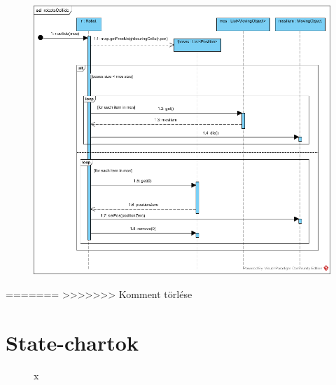 \begin{figure}[!htbp]
	\begin{center}
		\includegraphics[width=166mm, center]{./chapters/chapter04/robotsCollide.png}
		\caption{}
	\end{center}
\end{figure}

=======
>>>>>>> Komment törlése
\section{State-chartok}


\begin{figure}[h]
\begin{center}
\caption{x}
\label{fig:example3}
\end{center}
\end{figure}

